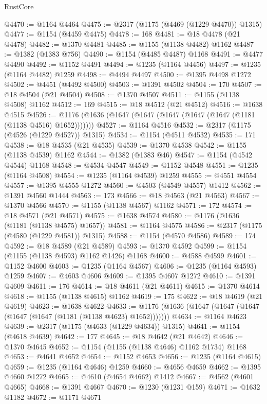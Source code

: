 \begin{lexlean}{RustCore}
\begin{coremodule}
@4470 := @1164 @4464
@4475 := @2317 (@1175 (@4469 (@1229 @4470)) @1315)
@4477 := @1154 (@4459 @4475)
@4478 := 168
@4481 := @18 @4478 (@21 @4478)
@4482 := @1370 @4481
@4485 := @1155 (@1138 @4482) @1162
@4487 := @1382 (@1383 @756)
@4490 := @1154 (@4485 @4487) @1168
@4491 := @4477 @4490
@4492 := @1152 @4491
@4494 := @1235 (@1164 @4456)
@4497 := @1235 (@1164 @4482) @1259
@4498 := @4494 @4497
@4500 := @1395 @4498 @1272
@4502 := @4451 (@4492 @4500)
@4503 := @1391 @4502
@4504 := 170
@4507 := @18 @4504 (@21 @4504)
@4508 := @1370 @4507
@4511 := @1155 (@1138 @4508) @1162
@4512 := 169
@4515 := @18 @4512 (@21 @4512)
@4516 := @1638 @4515
@4526 := @1176 (@1636 (@1647 (@1647 (@1647 (@1647 (@1647 (@1181 (@1138 @4516) @1652)))))))
@4527 := @1164 @4516
@4532 := @2317 (@1175 (@4526 (@1229 @4527)) @1315)
@4534 := @1154 (@4511 @4532)
@4535 := 171
@4538 := @18 @4535 (@21 @4535)
@4539 := @1370 @4538
@4542 := @1155 (@1138 @4539) @1162
@4544 := @1382 (@1383 @46)
@4547 := @1154 (@4542 @4544) @1168
@4548 := @4534 @4547
@4549 := @1152 @4548
@4551 := @1235 (@1164 @4508)
@4554 := @1235 (@1164 @4539) @1259
@4555 := @4551 @4554
@4557 := @1395 @4555 @1272
@4560 := @4503 (@4549 @4557) @1412
@4562 := @1391 @4560 @1444
@4563 := 173
@4566 := @18 @4563 (@21 @4563)
@4567 := @1370 @4566
@4570 := @1155 (@1138 @4567) @1162
@4571 := 172
@4574 := @18 @4571 (@21 @4571)
@4575 := @1638 @4574
@4580 := @1176 (@1636 (@1181 (@1138 @4575) @1657))
@4581 := @1164 @4575
@4586 := @2317 (@1175 (@4580 (@1229 @4581)) @1315)
@4588 := @1154 (@4570 @4586)
@4589 := 174
@4592 := @18 @4589 (@21 @4589)
@4593 := @1370 @4592
@4599 := @1154 (@1155 (@1138 @4593) @1162 @1426) @1168
@4600 := @4588 @4599
@4601 := @1152 @4600
@4603 := @1235 (@1164 @4567)
@4606 := @1235 (@1164 @4593) @1259
@4607 := @4603 @4606
@4609 := @1395 @4607 @1272
@4610 := @1391 @4609
@4611 := 176
@4614 := @18 @4611 (@21 @4611)
@4615 := @1370 @4614
@4618 := @1155 (@1138 @4615) @1162
@4619 := 175
@4622 := @18 @4619 (@21 @4619)
@4623 := @1638 @4622
@4633 := @1176 (@1636 (@1647 (@1647 (@1647 (@1647 (@1647 (@1181 (@1138 @4623) @1652)))))))
@4634 := @1164 @4623
@4639 := @2317 (@1175 (@4633 (@1229 @4634)) @1315)
@4641 := @1154 (@4618 @4639)
@4642 := 177
@4645 := @18 @4642 (@21 @4642)
@4646 := @1370 @4645
@4652 := @1154 (@1155 (@1138 @4646) @1162 @1734) @1168
@4653 := @4641 @4652
@4654 := @1152 @4653
@4656 := @1235 (@1164 @4615)
@4659 := @1235 (@1164 @4646) @1259
@4660 := @4656 @4659
@4662 := @1395 @4660 @1272
@4665 := @4610 (@4654 @4662) @1412
@4667 := @4562 (@4601 @4665)
@4668 := @1391 @4667
@4670 := @1230 (@1231 @159)
@4671 := @1632 @1182
@4672 := @1171 @4671

\end{coremodule}
\end{lexlean}
